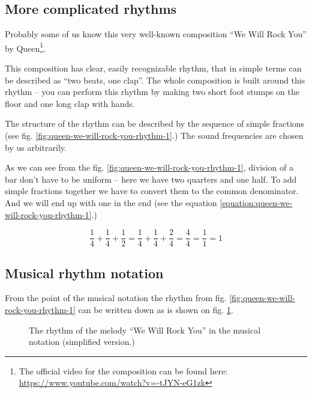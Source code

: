 \documentclass[../sparc.tex]{subfiles}
\begin{document}
\subsection{More complicated rhythms}

Probably some of us know this very well-known composition ``We Will Rock You''
by Queen\footnote{The official video for the composition can be found here:
\url{https://www.youtube.com/watch?v=-tJYN-eG1zk}}.

This composition has clear, easily recognizable rhythm, that in simple terms can
be described as ``two beats, one clap''.  The whole composition is built around
this rhythm -- you can perform this rhythm by making two short foot stumps on the
floor and one long clap with hands.


The structure of the rhythm can be described by the sequence of simple fractions
(see fig. \ref{fig:queen-we-will-rock-you-rhythm-1}.)  The sound frequencies are
chosen by us arbitrarily.

As we can see from the fig. \ref{fig:queen-we-will-rock-you-rhythm-1}, division
of a bar don't have to be uniform -- here we have two quarters and one half.  To
add simple fractions together we have to convert them to the common denominator.
And we will end up with one in the end (see the equation
\ref{equation:queen-we-will-rock-you-rhythm-1}.)

\begin{equation}
  \frac{1}{4} + \frac{1}{4} + \frac{1}{2} = \frac{1}{4} + \frac{1}{4} + \frac{2}{4} = \frac{4}{4} = \frac{1}{1} = 1
  \label{equation:queen-we-will-rock-you-rhythm-1}
\end{equation}

\subsection{Musical rhythm notation}

From the point of the musical notation the rhythm from
fig. \ref{fig:queen-we-will-rock-you-rhythm-1} can be written down as is shown
on fig. \ref{fig:lilypond-queen-1}.

\begin{figure}[ht]
  \centering
  \caption{The rhythm of the melody ``We Will Rock You'' in the musical notation
    (simplified version.)}
  \label{fig:lilypond-queen-1}
\end{figure}
\end{document}
